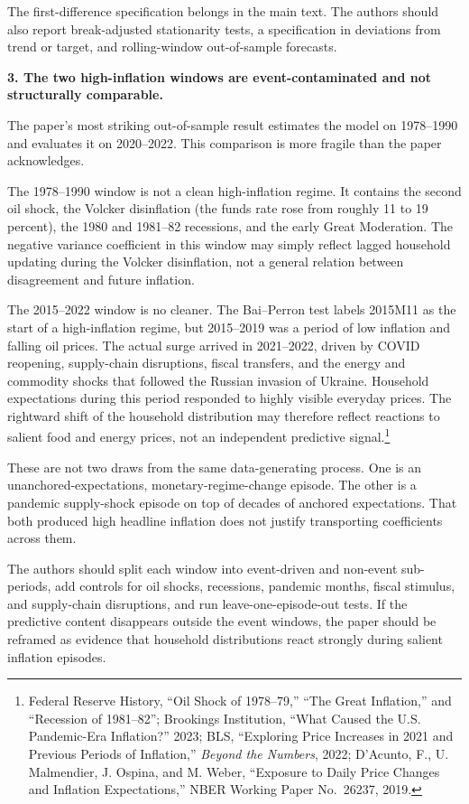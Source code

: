 \documentclass[11pt, a4paper]{article}
\begin{document}
The first-difference specification belongs in the main text. The authors should also report break-adjusted stationarity tests, a specification in deviations from trend or target, and rolling-window out-of-sample forecasts.

\textbf{3. The two high-inflation windows are event-contaminated and not structurally comparable.}

The paper's most striking out-of-sample result estimates the model on 1978--1990 and evaluates it on 2020--2022. This comparison is more fragile than the paper acknowledges.

The 1978--1990 window is not a clean high-inflation regime. It contains the second oil shock, the Volcker disinflation (the funds rate rose from roughly 11 to 19 percent), the 1980 and 1981--82 recessions, and the early Great Moderation. The negative variance coefficient in this window may simply reflect lagged household updating during the Volcker disinflation, not a general relation between disagreement and future inflation.

The 2015--2022 window is no cleaner. The Bai--Perron test labels 2015M11 as the start of a high-inflation regime, but 2015--2019 was a period of low inflation and falling oil prices. The actual surge arrived in 2021--2022, driven by COVID reopening, supply-chain disruptions, fiscal transfers, and the energy and commodity shocks that followed the Russian invasion of Ukraine. Household expectations during this period responded to highly visible everyday prices. The rightward shift of the household distribution may therefore reflect reactions to salient food and energy prices, not an independent predictive signal.\footnote{Federal Reserve History, ``Oil Shock of 1978--79,'' ``The Great Inflation,'' and ``Recession of 1981--82''; Brookings Institution, ``What Caused the U.S. Pandemic-Era Inflation?'' 2023; BLS, ``Exploring Price Increases in 2021 and Previous Periods of Inflation,'' \textit{Beyond the Numbers}, 2022; D'Acunto, F., U. Malmendier, J. Ospina, and M. Weber, ``Exposure to Daily Price Changes and Inflation Expectations,'' NBER Working Paper No.~26237, 2019.}

These are not two draws from the same data-generating process. One is an unanchored-expectations, monetary-regime-change episode. The other is a pandemic supply-shock episode on top of decades of anchored expectations. That both produced high headline inflation does not justify transporting coefficients across them.

The authors should split each window into event-driven and non-event sub-periods, add controls for oil shocks, recessions, pandemic months, fiscal stimulus, and supply-chain disruptions, and run leave-one-episode-out tests. If the predictive content disappears outside the event windows, the paper should be reframed as evidence that household distributions react strongly during salient inflation episodes.
\end{document}
